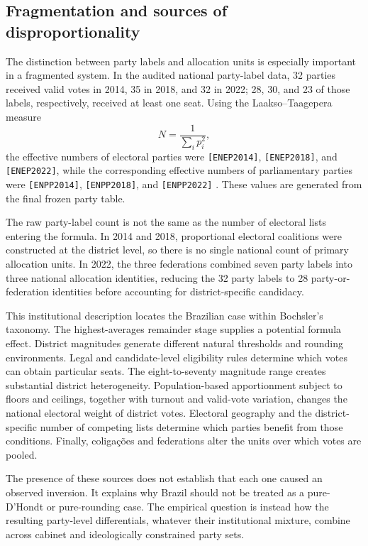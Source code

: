 \documentclass[11pt]{article}
\begin{document}
\subsection{Fragmentation and sources of disproportionality}

The distinction between party labels and allocation units is especially
important in a fragmented system. In the audited national party-label data,
32 parties received valid votes in 2014, 35 in 2018, and 32 in 2022; 28, 30,
and 23 of those labels, respectively, received at least one seat. Using the
Laakso--Taagepera measure
\[
N=\frac{1}{\sum_i p_i^2},
\]
the effective numbers of electoral parties were
\texttt{[ENEP2014]}, \texttt{[ENEP2018]}, and
\texttt{[ENEP2022]}, while the corresponding effective numbers of
parliamentary parties were
\texttt{[ENPP2014]}, \texttt{[ENPP2018]}, and
\texttt{[ENPP2022]}
\parencite{laakso1979effective}.
These values are generated from the final frozen party table.

The raw party-label count is not the same as the number of electoral lists
entering the formula. In 2014 and 2018, proportional electoral coalitions
were constructed at the district level, so there is no single national count
of primary allocation units. In 2022, the three federations combined seven
party labels into three national allocation identities, reducing the 32 party
labels to 28 party-or-federation identities before accounting for
district-specific candidacy.

This institutional description locates the Brazilian case within Bochsler's
taxonomy. The highest-averages remainder stage supplies a potential
formula effect. District magnitudes generate different natural thresholds and
rounding environments. Legal and candidate-level eligibility rules determine
which votes can obtain particular seats. The eight-to-seventy magnitude
range creates substantial district heterogeneity. Population-based
apportionment subject to floors and ceilings, together with turnout and
valid-vote variation, changes the national electoral weight of district votes.
Electoral geography and the district-specific number of competing lists
determine which parties benefit from those conditions. Finally, coligações
and federations alter the units over which votes are pooled.

The presence of these sources does not establish that each one caused an
observed inversion. It explains why Brazil should not be treated as a
pure-D'Hondt or pure-rounding case. The empirical question is instead how
the resulting party-level differentials, whatever their institutional mixture,
combine across cabinet and ideologically constrained party sets.
\end{document}

